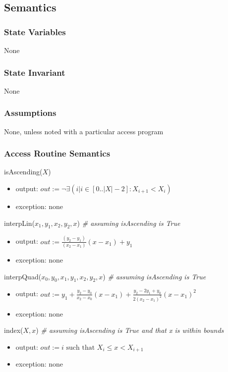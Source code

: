 \documentclass[12pt, titlepage]{article}
\begin{document}
\subsection {Semantics}

\subsubsection {State Variables}

None

\subsubsection {State Invariant}

None

\subsubsection {Assumptions}

None, unless noted with a particular access program

\subsubsection {Access Routine Semantics}

\noindent isAscending($X$)
\begin{itemize}
\item output: $out := \neg \exists(i | i \in [0..|X|-2] : X_{i+1} < X_i)$
\item exception: none
\end{itemize}

\noindent interpLin($x_1, y_1, x_2, y_2, x$) \textit{\# assuming isAscending is True}
\begin{itemize}
\item output: $out := \frac{(y_2 - y_1)}{(x_2-x_1)} (x - x_1) + y_1$
\item exception: none
\end{itemize}

\noindent interpQuad($x_0, y_0, x_1, y_1, x_2, y_2, x$) \textit{\# assuming isAscending is True}
\begin{itemize}
\item output: $out := y_1 + \frac{y_2 - y_0}{x_2-x_0} (x - x_1) + \frac{y_2 - 2 y_1 + y_0}{2
  (x_2-x_1)^2} (x - x_1)^2$
\item exception: none
\end{itemize}

\noindent index($X, x$) \textit{\# assuming isAscending is True and that x is
  within bounds}
\begin{itemize}
\item output: $out := i \mbox{ such that } X_i \leq x < X_{i+1}$
\item exception: none
\end{itemize}
\end{document}
